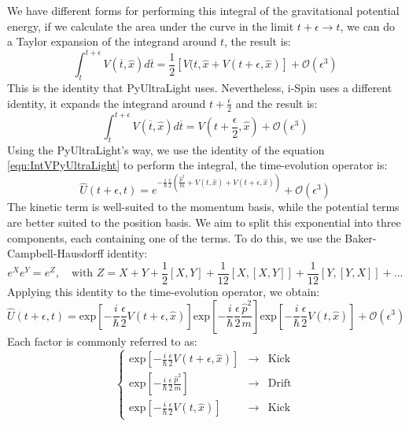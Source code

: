 \documentclass[12pt]{article}
\begin{document}
We have different forms for performing this integral of the gravitational potential energy, if we calculate the area under the curve in the limit $t+\epsilon \rightarrow t$, we can do a Taylor expansion of the integrand around $t$, the result is:
\begin{equation}
\label{eqn:IntVPyUltraLight}
    \int_{t}^{t+\epsilon}V(\overline{t},\hat{x})d\overline{t}=\frac{1}{2}\left[V(t,\hat{x}+V(t+\epsilon,\hat{x}) \right]+\mathcal{O}(\epsilon^3)
\end{equation}
This is the identity that PyUltraLight\cite{edwards2018pyultralight} uses. Nevertheless, i-Spin\cite{jain2023spin} uses a different identity, it expands the integrand around $t+\frac{\epsilon}{2}$ and the result is:
\begin{equation}
    \label{eqn:IntViSpin}\int_{t}^{t+\epsilon}V(\overline{t},\hat{x})d\overline{t}=V\left(t+\frac{\epsilon}{2},\hat{x}\right)+\mathcal{O}(\epsilon^3)
\end{equation}
Using the PyUltraLight's way, we use the identity of the equation \ref{eqn:IntVPyUltraLight} to perform the integral, the time-evolution operator is:
\begin{equation}
    \hat{U}(t+\epsilon,t)=e^{-\frac{i}{\hbar}\frac{\epsilon}{2}\left(\frac{\hat{p}^2}{m}+V(t,\hat{x})+V(t+\epsilon,\hat{x}) \right)}+\mathcal{O}(\epsilon^3)
\end{equation}
The kinetic term is well-suited to the momentum basis, while the potential terms are better suited to the position basis. We aim to split this exponential into three components, each containing one of the terms. To do this, we use the Baker-Campbell-Hausdorff identity:
\begin{equation}
\label{eqn:BCH}
    e^{X}e^{Y}=e^{Z}, \quad \text{with } Z=X+Y+\frac{1}{2}[X,Y]+\frac{1}{12}[X,[X,Y]]+\frac{1}{12}[Y,[Y,X]]+...
\end{equation}
Applying this identity to the time-evolution operator, we obtain:
\begin{equation}
    \hat{U}(t+\epsilon,t)=\text{exp}\left[-\frac{i}{\hbar}\frac{\epsilon}{2}V(t+\epsilon,\hat{x}) \right]\text{exp}\left[ -\frac{i}{\hbar}\frac{\epsilon}{2}\frac{\hat{p}^2}{m}\right]\text{exp}\left[ -\frac{i}{\hbar}\frac{\epsilon}{2}V(t,\hat{x})\right]+\mathcal{O}(\epsilon^3)
\end{equation}
Each factor is commonly referred to as:
\begin{equation}
    \left\{ \begin{array}{rcl}
\text{exp}\left[-\frac{i}{\hbar}\frac{\epsilon}{2}V(t+\epsilon,\hat{x}) \right] &\rightarrow& \text{Kick} \\
\text{exp}\left[ -\frac{i}{\hbar}\frac{\epsilon}{2}\frac{\hat{p}^2}{m}\right] &\rightarrow& \text{Drift} \\
\text{exp}\left[ -\frac{i}{\hbar}\frac{\epsilon}{2}V(t,\hat{x})\right] &\rightarrow& \text{Kick}
\end{array}\right.
\end{equation}
\end{document}
